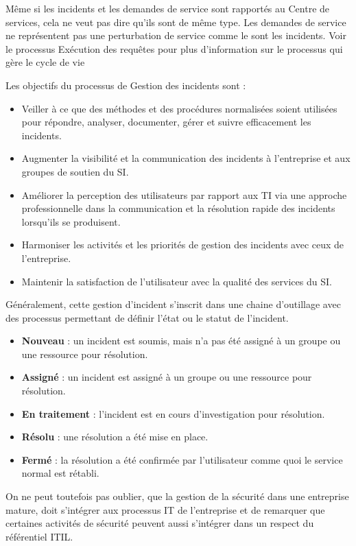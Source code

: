 Même si les incidents et les demandes de service sont rapportés au Centre de services, cela ne veut pas dire qu'ils sont de même type. Les demandes de service ne représentent pas une perturbation de service comme le sont les incidents. Voir le processus Exécution des requêtes pour plus d'information sur le processus qui gère le cycle de vie 

Les objectifs du processus de Gestion des incidents sont :

\begin{itemize}
  \item Veiller à ce que des méthodes et des procédures normalisées soient utilisées pour répondre, analyser, documenter, gérer et suivre efficacement les incidents.
  \item  Augmenter la visibilité et la communication des incidents à l'entreprise et aux groupes de soutien du SI.
  \item  Améliorer la perception des utilisateurs par rapport aux TI via une approche professionnelle dans la communication et la résolution rapide des incidents lorsqu'ils se produisent.
  \item Harmoniser les activités et les priorités de gestion des incidents avec ceux de l'entreprise.
  \item Maintenir la satisfaction de l'utilisateur avec la qualité des services du SI.
\end{itemize}

Généralement, cette gestion d'incident s'inscrit dans une chaine d'outillage avec des processus permettant de définir l'état ou le statut de l'incident.

\begin{itemize}
  \item \textbf{Nouveau} : un incident est soumis, mais n'a pas été assigné à un groupe ou une ressource pour résolution.
  \item \textbf{Assigné} : un incident est assigné à un groupe ou une ressource pour résolution.
  \item \textbf{En traitement }: l'incident est en cours d'investigation pour résolution.
  \item \textbf{Résolu} : une résolution a été mise en place.
  \item \textbf{Fermé} : la résolution a été confirmée par l'utilisateur comme quoi le service normal est rétabli.
\end{itemize}

On ne peut toutefois pas oublier, que la gestion de la sécurité dans une entreprise mature, doit s'intégrer aux processus IT de l'entreprise et de remarquer que certaines activités de sécurité peuvent aussi s'intégrer dans un respect du référentiel ITIL.

